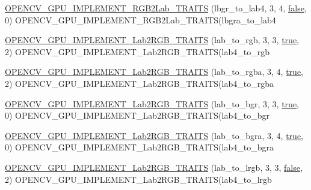 \begin{DoxyCompactItemize}
\item 
\hyperlink{namespacecv_1_1gpu_1_1device_af89308d4c3a44d1e317d7d7f16b3acb3}{O\-P\-E\-N\-C\-V\-\_\-\-G\-P\-U\-\_\-\-I\-M\-P\-L\-E\-M\-E\-N\-T\-\_\-\-R\-G\-B2\-Lab\-\_\-\-T\-R\-A\-I\-T\-S} (lbgr\-\_\-to\-\_\-lab4, 3, 4, \hyperlink{namespacecv_1_1gpu_1_1device_af8d6418be1712e83b4f398e7e7273026}{false}, 0) O\-P\-E\-N\-C\-V\-\_\-\-G\-P\-U\-\_\-\-I\-M\-P\-L\-E\-M\-E\-N\-T\-\_\-\-R\-G\-B2\-Lab\-\_\-\-T\-R\-A\-I\-T\-S(lbgra\-\_\-to\-\_\-lab4
\item 
\hyperlink{namespacecv_1_1gpu_1_1device_acc53350542a368a8170083fc6ed72b0b}{O\-P\-E\-N\-C\-V\-\_\-\-G\-P\-U\-\_\-\-I\-M\-P\-L\-E\-M\-E\-N\-T\-\_\-\-Lab2\-R\-G\-B\-\_\-\-T\-R\-A\-I\-T\-S} (lab\-\_\-to\-\_\-rgb, 3, 3, \hyperlink{namespacecv_1_1gpu_1_1device_ac34c172a7a1904fb0fd477321a31f926}{true}, 2) O\-P\-E\-N\-C\-V\-\_\-\-G\-P\-U\-\_\-\-I\-M\-P\-L\-E\-M\-E\-N\-T\-\_\-\-Lab2\-R\-G\-B\-\_\-\-T\-R\-A\-I\-T\-S(lab4\-\_\-to\-\_\-rgb
\item 
\hyperlink{namespacecv_1_1gpu_1_1device_ac28ff688a85e12d71adf22cd351b8197}{O\-P\-E\-N\-C\-V\-\_\-\-G\-P\-U\-\_\-\-I\-M\-P\-L\-E\-M\-E\-N\-T\-\_\-\-Lab2\-R\-G\-B\-\_\-\-T\-R\-A\-I\-T\-S} (lab\-\_\-to\-\_\-rgba, 3, 4, \hyperlink{namespacecv_1_1gpu_1_1device_ac34c172a7a1904fb0fd477321a31f926}{true}, 2) O\-P\-E\-N\-C\-V\-\_\-\-G\-P\-U\-\_\-\-I\-M\-P\-L\-E\-M\-E\-N\-T\-\_\-\-Lab2\-R\-G\-B\-\_\-\-T\-R\-A\-I\-T\-S(lab4\-\_\-to\-\_\-rgba
\item 
\hyperlink{namespacecv_1_1gpu_1_1device_af8dbb767807f17a102b285143f560c37}{O\-P\-E\-N\-C\-V\-\_\-\-G\-P\-U\-\_\-\-I\-M\-P\-L\-E\-M\-E\-N\-T\-\_\-\-Lab2\-R\-G\-B\-\_\-\-T\-R\-A\-I\-T\-S} (lab\-\_\-to\-\_\-bgr, 3, 3, \hyperlink{namespacecv_1_1gpu_1_1device_ac34c172a7a1904fb0fd477321a31f926}{true}, 0) O\-P\-E\-N\-C\-V\-\_\-\-G\-P\-U\-\_\-\-I\-M\-P\-L\-E\-M\-E\-N\-T\-\_\-\-Lab2\-R\-G\-B\-\_\-\-T\-R\-A\-I\-T\-S(lab4\-\_\-to\-\_\-bgr
\item 
\hyperlink{namespacecv_1_1gpu_1_1device_a4bc36cd958c0c18b0f9c8e3d71e66658}{O\-P\-E\-N\-C\-V\-\_\-\-G\-P\-U\-\_\-\-I\-M\-P\-L\-E\-M\-E\-N\-T\-\_\-\-Lab2\-R\-G\-B\-\_\-\-T\-R\-A\-I\-T\-S} (lab\-\_\-to\-\_\-bgra, 3, 4, \hyperlink{namespacecv_1_1gpu_1_1device_ac34c172a7a1904fb0fd477321a31f926}{true}, 0) O\-P\-E\-N\-C\-V\-\_\-\-G\-P\-U\-\_\-\-I\-M\-P\-L\-E\-M\-E\-N\-T\-\_\-\-Lab2\-R\-G\-B\-\_\-\-T\-R\-A\-I\-T\-S(lab4\-\_\-to\-\_\-bgra
\item 
\hyperlink{namespacecv_1_1gpu_1_1device_a40f7c6a6d9a8597f9b40e1309464302a}{O\-P\-E\-N\-C\-V\-\_\-\-G\-P\-U\-\_\-\-I\-M\-P\-L\-E\-M\-E\-N\-T\-\_\-\-Lab2\-R\-G\-B\-\_\-\-T\-R\-A\-I\-T\-S} (lab\-\_\-to\-\_\-lrgb, 3, 3, \hyperlink{namespacecv_1_1gpu_1_1device_af8d6418be1712e83b4f398e7e7273026}{false}, 2) O\-P\-E\-N\-C\-V\-\_\-\-G\-P\-U\-\_\-\-I\-M\-P\-L\-E\-M\-E\-N\-T\-\_\-\-Lab2\-R\-G\-B\-\_\-\-T\-R\-A\-I\-T\-S(lab4\-\_\-to\-\_\-lrgb

\end{DoxyCompactItemize}
